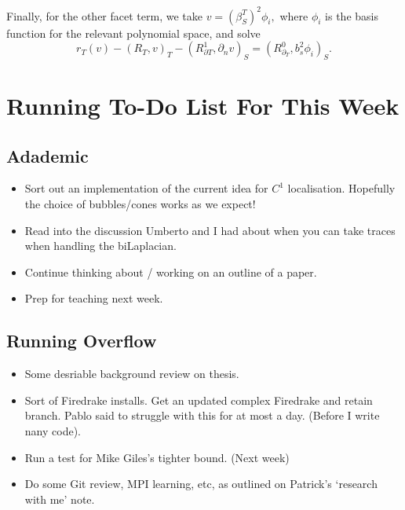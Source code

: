 \documentclass[12pt,a4paper]{article}
\begin{document}
Finally, for the other facet term, we take $v = (\beta_S^T)^2\phi_i,$ where $\phi_i$ is the basis function for the relevant polynomial space, and solve
\begin{equation}
    r_T(v) - (R_T, v)_T - (R_{\partial T}^1, \partial_n v)_S = (R_{\partial_T}^0, b_s^2 \phi_i)_S.
\end{equation}








\newpage

\section{Running To-Do List For This Week}

\subsection{Adademic}
\begin{itemize}
    \item Sort out an implementation of the current idea for $C^1$ localisation. Hopefully the choice of bubbles/cones works as we expect!
    \item Read into the discussion Umberto and I had about when you can take traces when handling the biLaplacian.
    \item Continue thinking about / working on an outline of a paper. 
    \item Prep for teaching next week.
\end{itemize}

\subsection{Running Overflow}

\begin{itemize}
    \item Some desriable background review on thesis. 
    \item Sort of Firedrake installs. Get an updated complex Firedrake and retain branch. Pablo said to struggle with this for at most a day. (Before I write nany code).
    \item Run a test for Mike Giles's tighter bound. (Next week)
    \item Do some Git review, MPI learning, etc, as outlined on Patrick's `research with me' note. 
\end{itemize}
\end{document}
